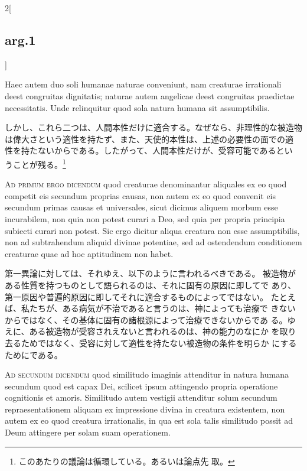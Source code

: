 \documentclass[paper=a4paper,fontsize=10pt,jafontsize=9pt,titlepage]{jlreq}
\begin{document}
\begin{paracol}{2}[\subsection{arg.1}]
\switchcolumn*

Haec autem duo soli humanae naturae
conveniunt, nam creaturae irrationali deest congruitas dignitatis;
naturae autem angelicae deest congruitas praedictae necessitatis. Unde
relinquitur quod sola natura humana sit assumptibilis.

\switchcolumn

しかし、これら二つは、人間本性だけに適合する。なぜなら、非理性的な被造物
 は偉大さという適性を持たず、また、天使的本性は、上述の必要性の面での適
 性を持たないからである。したがって、人間本性だけが、受容可能であるとい
 うことが残る。\footnote{このあたりの議論は循環している。あるいは論点先
 取。}

\switchcolumn*[\subsection{ad.1}]

{\scshape Ad primum ergo dicendum} quod creaturae denominantur aliquales ex eo quod
competit eis secundum proprias causas, non autem ex eo quod convenit eis
secundum primas causas et universales, sicut dicimus aliquem morbum esse
incurabilem, non quia non potest curari a Deo, sed quia per propria
principia subiecti curari non potest. Sic ergo dicitur aliqua creatura
non esse assumptibilis, non ad subtrahendum aliquid divinae potentiae,
sed ad ostendendum conditionem creaturae quae ad hoc aptitudinem non
habet.

\switchcolumn

第一異論に対しては、それゆえ、以下のように言われるべきである。
被造物がある性質を持つものとして語られるのは、それに固有の原因に即してで
 あり、第一原因や普遍的原因に即してそれに適合するものによってではない。
 たとえば、私たちが、ある病気が不治であると言うのは、神によっても治療で
 きないからではなく、その基体に固有の諸根源によって治療できないからであ
 る。ゆえに、ある被造物が受容されえないと言われるのは、神の能力のなにか
 を取り去るためではなく、受容に対して適性を持たない被造物の条件を明らか
 にするためにである。

\switchcolumn*[\subsection{ad.2}]

{\scshape Ad secundum dicendum} quod similitudo imaginis attenditur in natura
humana secundum quod est capax Dei, scilicet ipsum attingendo propria
operatione cognitionis et amoris. Similitudo autem vestigii attenditur
solum secundum repraesentationem aliquam ex impressione divina in
creatura existentem, non autem ex eo quod creatura irrationalis, in qua
est sola talis similitudo possit ad Deum attingere per solam suam
operationem.


\end{paracol}
\end{document}
